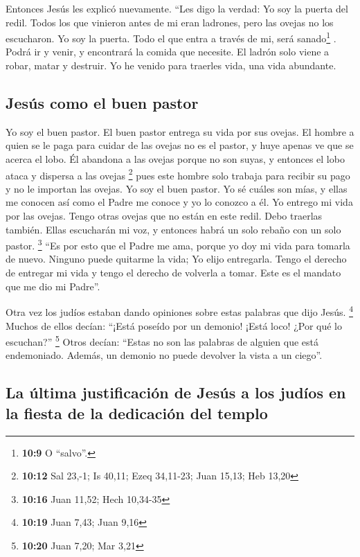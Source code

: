  Entonces Jesús les explicó nuevamente. ``Les digo la
verdad: Yo soy la puerta del redil.  Todos los que
vinieron antes de mi eran ladrones, pero las ovejas no los escucharon.
 Yo soy la puerta. Todo el que entra a través de mi, será
sanado\footnote{\textbf{10:9} O ``salvo''.} . Podrá ir y venir, y
encontrará la comida que necesite.  El ladrón solo viene
a robar, matar y destruir. Yo he venido para traerles vida, una vida
abundante.

\hypertarget{jesuxfas-como-el-buen-pastor}{%
\subsection{Jesús como el buen
pastor}\label{jesuxfas-como-el-buen-pastor}}

 Yo soy el buen pastor. El buen pastor entrega su vida
por sus ovejas.  El hombre a quien se le paga para cuidar
de las ovejas no es el pastor, y huye apenas ve que se acerca el lobo.
Él abandona a las ovejas porque no son suyas, y entonces el lobo ataca y
dispersa a las ovejas \footnote{\textbf{10:12} Sal 23,-1; Is 40,11; Ezeq
  34,11-23; Juan 15,13; Heb 13,20}  pues este hombre solo
trabaja para recibir su pago y no le importan las ovejas.
 Yo soy el buen pastor. Yo sé cuáles son mías, y ellas me
conocen  así como el Padre me conoce y yo lo conozco a
él. Yo entrego mi vida por las ovejas.  Tengo otras
ovejas que no están en este redil. Debo traerlas también. Ellas
escucharán mi voz, y entonces habrá un solo rebaño con un solo pastor.
\footnote{\textbf{10:16} Juan 11,52; Hech 10,34-35}  ``Es
por esto que el Padre me ama, porque yo doy mi vida para tomarla de
nuevo.  Ninguno puede quitarme la vida; Yo elijo
entregarla. Tengo el derecho de entregar mi vida y tengo el derecho de
volverla a tomar. Este es el mandato que me dio mi Padre''.

 Otra vez los judíos estaban dando opiniones sobre estas
palabras que dijo Jesús. \footnote{\textbf{10:19} Juan 7,43; Juan 9,16}
 Muchos de ellos decían: ``¡Está poseído por un demonio!
¡Está loco! ¿Por qué lo escuchan?'' \footnote{\textbf{10:20} Juan 7,20;
  Mar 3,21}  Otros decían: ``Estas no son las palabras de
alguien que está endemoniado. Además, un demonio no puede devolver la
vista a un ciego''.

\hypertarget{la-uxfaltima-justificaciuxf3n-de-jesuxfas-a-los-juduxedos-en-la-fiesta-de-la-dedicaciuxf3n-del-templo}{%
\subsection{La última justificación de Jesús a los judíos en la fiesta
de la dedicación del
templo}\label{la-uxfaltima-justificaciuxf3n-de-jesuxfas-a-los-juduxedos-en-la-fiesta-de-la-dedicaciuxf3n-del-templo}}

